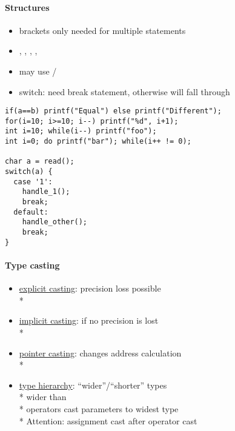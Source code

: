 \paragraph{Structures}
\begin{itemize}
  \item brackets only needed for multiple statements
  \item {}, , , , 
  \item may use /
  \item switch: need break statement, otherwise will fall through
\end{itemize}
\begin{lstlisting}[style=customc]
if(a==b) printf("Equal") else printf("Different");
for(i=10; i>=10; i--) printf("%d", i+1);
int i=10; while(i--) printf("foo");
int i=0; do printf("bar"); while(i++ != 0);

char a = read();
switch(a) {
  case '1':
    handle_1();
    break;
  default:
    handle_other();
    break;
}
\end{lstlisting}

\paragraph{Type casting}
\begin{itemize}
  \item \underline{explicit casting}: precision loss possible \\*
  \item \underline{implicit casting}: if no precision is lost \\*
  \item \underline{pointer casting}: changes address calculation \\*
  \item \underline{type hierarchy}: "`wider"'/"`shorter"' types \\*
     wider than  \\*
    operators cast parameters to widest type \\*
    Attention: assignment cast after operator cast
\end{itemize}

